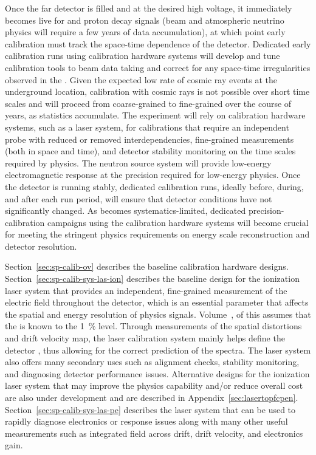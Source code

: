 Once the far detector is filled and at the desired high voltage, it immediately becomes live for  and proton decay signals (beam and atmospheric neutrino physics will require a few years of data accumulation), at which point %
early calibration must track %
the space-time dependence of the detector. Dedicated early calibration runs using calibration hardware systems will develop and tune calibration tools to beam data taking and correct for any space-time irregularities observed in the . Given the expected low rate of cosmic ray events at the underground location, calibration with cosmic rays is not possible over short time scales and will proceed from coarse-grained to fine-grained over the course of years, as statistics accumulate. 
The experiment will rely on calibration hardware systems, such as a laser system, for calibrations that require an independent probe with reduced or removed interdependencies, fine-grained measurements (both in space and time), and detector stability monitoring on the time scales required by physics. The neutron source system will provide low-energy electromagnetic response at the precision required for low-energy  physics. 
Once the detector is running stably, dedicated calibration runs, ideally before, during, and after each run period, will ensure that detector conditions have not significantly changed. As  becomes systematics-limited, dedicated precision-calibration campaigns using the calibration hardware systems will become crucial for meeting the stringent physics requirements on energy scale reconstruction and detector resolution.

Section~\ref{sec:sp-calib-ov} describes the baseline calibration hardware designs. Section~\ref{sec:sp-calib-sys-las-ion} describes the baseline design for the ionization laser system that provides an independent, fine-grained measurement of the electric field throughout the detector, which is an essential parameter that affects the spatial and energy resolution of physics signals. 
Volume~\volnumberphysics, \voltitlephysics of this 
assumes that the  is known to the \SI{1}{\%} level. Through measurements of the spatial distortions and drift velocity map, the laser calibration system mainly helps define the detector , thus allowing for the correct prediction of the  spectra. The laser system also offers many secondary uses such as alignment checks, stability monitoring, and diagnosing detector performance issues. Alternative designs for the ionization laser system that may improve the physics capability and/or reduce overall cost are also under development and are described in Appendix~\ref{sec:lasertopfcpen}. %
Section~\ref{sec:sp-calib-sys-las-pe} describes the \phel laser system that can be used to rapidly diagnose electronics or  response issues along with many other useful measurements such as integrated field across drift, drift velocity, and electronics gain. 

